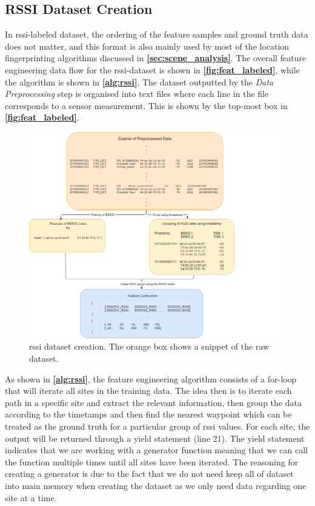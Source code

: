 \subsection{RSSI Dataset Creation}
In \gls{rssi}-labeled dataset, the ordering of the feature samples and ground truth data does not matter, and this format is also mainly used by most of the location fingerprinting algorithms discussed in \textbf{\autoref{sec:scene_analysis}}.
The overall feature engineering data flow for the \gls{rssi}-dataset is shown in \textbf{\autoref{fig:feat_labeled}}, while the algorithm is shown in \textbf{\autoref{alg:rssi}}. The dataset outputted by the \textit{Data Preprocessing} step is organised into text files where each line in the file corresponds to a sensor measurement. This is shown by the top-most box in \textbf{\autoref{fig:feat_labeled}}.

\begin{figure}[H]
    \centering
    \includegraphics[width=1\textwidth]{Images/DataStandard/feat_eng_labeled (3).png}
    \caption{\gls{rssi} dataset creation. The orange box shows a snippet of the raw dataset.}
    \label{fig:feat_labeled}
\end{figure}

As shown in \textbf{\autoref{alg:rssi}}, the feature engineering algorithm consists of a for-loop that will iterate all sites in the training data. The idea then is to iterate each path in a specific site and extract the relevant information, then group the data according to the timetamps and then find the nearest waypoint which can be treated as the ground truth for a particular group of \gls{rssi} values. For each site, the output will be returned through a yield statement (line 21). The yield statement indicates that we are working with a generator function meaning that we can call the function multiple times until all sites have been iterated. The reasoning for creating a generator is due to the fact that we do not need keep all of dataset into main memory when creating the dataset as we only need data regarding one site at a time.

